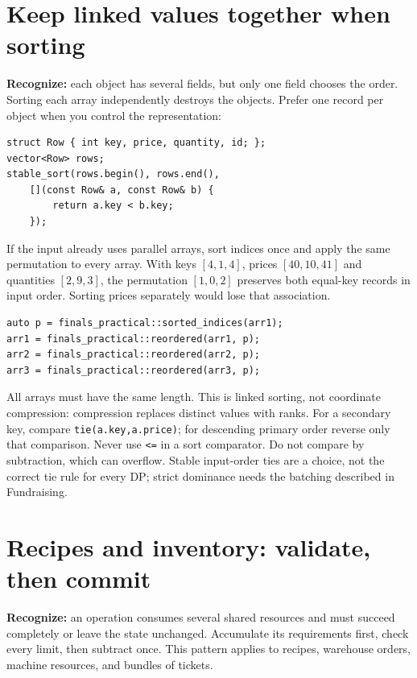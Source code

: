 \section{Keep linked values together when sorting}
\textbf{Recognize:} each object has several fields, but only one field
chooses the order. Sorting each array independently destroys the objects.
Prefer one record per object when you control the representation:
\begin{lstlisting}
struct Row { int key, price, quantity, id; };
vector<Row> rows;
stable_sort(rows.begin(), rows.end(),
    [](const Row& a, const Row& b) {
        return a.key < b.key;
    });
\end{lstlisting}
If the input already uses parallel arrays, sort indices once and apply the
same permutation to every array. With keys $[4,1,4]$, prices $[40,10,41]$
and quantities $[2,9,3]$, the permutation $[1,0,2]$ preserves both equal-key
records in input order. Sorting prices separately would lose that association.
\begin{lstlisting}
auto p = finals_practical::sorted_indices(arr1);
arr1 = finals_practical::reordered(arr1, p);
arr2 = finals_practical::reordered(arr2, p);
arr3 = finals_practical::reordered(arr3, p);
\end{lstlisting}
All arrays must have the same length. This is linked sorting, not coordinate
compression: compression replaces distinct values with ranks. For a secondary
key, compare \texttt{tie(a.key,a.price)}; for descending primary order reverse
only that comparison. Never use \texttt{<=} in a sort comparator. Do not
compare by subtraction, which can overflow. Stable input-order ties are a
choice, not the correct tie rule for every DP; strict dominance needs the
batching described in Fundraising.

\section{Recipes and inventory: validate, then commit}
\textbf{Recognize:} an operation consumes several shared resources and must
succeed completely or leave the state unchanged. Accumulate its requirements
first, check every limit, then subtract once. This pattern applies to recipes,
warehouse orders, machine resources, and bundles of tickets.

